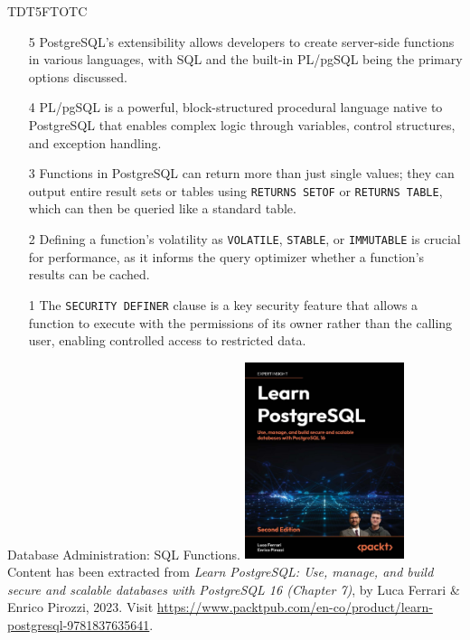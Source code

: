 \documentclass[aspectratio=169]{beamer}
\begin{document}
\begin{frame}[fragile]{TDT5FTOTC}
    \small
    \begin{itemize}
        \item[5] PostgreSQL's extensibility allows developers to create server-side functions in various languages, with SQL and the built-in PL/pgSQL being the primary options discussed. \pause

        \item[4] PL/pgSQL is a powerful, block-structured procedural language native to PostgreSQL that enables complex logic through variables, control structures, and exception handling. \pause

        \item[3] Functions in PostgreSQL can return more than just single values; they can output entire result sets or tables using \texttt{RETURNS SETOF} or \texttt{RETURNS TABLE}, which can then be queried like a standard table. \pause

        \item[2] Defining a function's volatility as \texttt{VOLATILE}, \texttt{STABLE}, or \texttt{IMMUTABLE} is crucial for performance, as it informs the query optimizer whether a function's results can be cached. \pause

        \item[1] The \texttt{SECURITY DEFINER} clause is a key security feature that allows a function to execute with the permissions of its owner rather than the calling user, enabling controlled access to restricted data.
    \end{itemize}
\end{frame}


\begin{frame}{Database Administration: SQL Functions.}
    \centering
    \includegraphics[width=0.35\textwidth]{figures/book_cover}\\
    \vspace{2mm}
    {
        \footnotesize
        Content has been extracted from \textit{Learn PostgreSQL: Use, manage, and build secure and scalable databases with PostgreSQL 16 (Chapter 7)}, by Luca Ferrari \& Enrico Pirozzi, 2023.  Visit \url{https://www.packtpub.com/en-co/product/learn-postgresql-9781837635641}.
    }
\end{frame}
\end{document}
